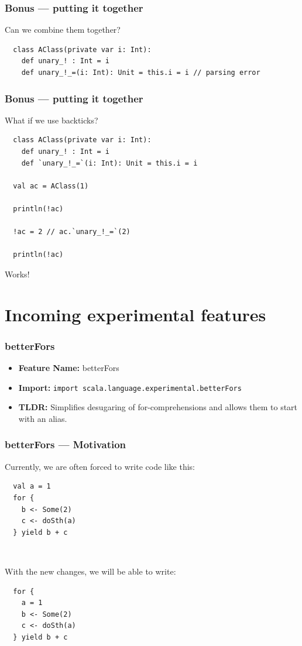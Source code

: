 \documentclass{beamer}
\begin{document}
\begin{frame}[fragile]
  \frametitle{Bonus --- putting it together}

  Can we combine them together?

  \begin{lstlisting}
  class AClass(private var i: Int):
    def unary_! : Int = i
    def unary_!_=(i: Int): Unit = this.i = i // parsing error
  \end{lstlisting}

\end{frame}

\begin{frame}[fragile]
  \frametitle{Bonus --- putting it together}

  What if we use backticks?

  \begin{lstlisting}
  class AClass(private var i: Int):
    def unary_! : Int = i
    def `unary_!_=`(i: Int): Unit = this.i = i
  
  val ac = AClass(1)

  println(!ac)

  !ac = 2 // ac.`unary_!_=`(2)

  println(!ac)
  \end{lstlisting}

  Works!

\end{frame}

\section{Incoming experimental features}

\begin{frame}[fragile]
  \frametitle{betterFors}
  \begin{itemize}
    \item \textbf{Feature Name:} betterFors
    \item \textbf{Import:} \texttt{import scala.language.experimental.betterFors}
    \item \textbf{TLDR:} Simplifies desugaring of for-comprehensions and allows them to start with an alias.
  \end{itemize}
\end{frame}

\begin{frame}[fragile]
  \frametitle{betterFors --- Motivation}

  Currently, we are often forced to write code like this:

  \begin{lstlisting}
  val a = 1
  for {
    b <- Some(2)
    c <- doSth(a)
  } yield b + c
  \end{lstlisting}

  \pause\

  With the new changes, we will be able to write:

  \begin{lstlisting}
  for {
    a = 1
    b <- Some(2)
    c <- doSth(a)
  } yield b + c
  \end{lstlisting}
  
\end{frame}
\end{document}
